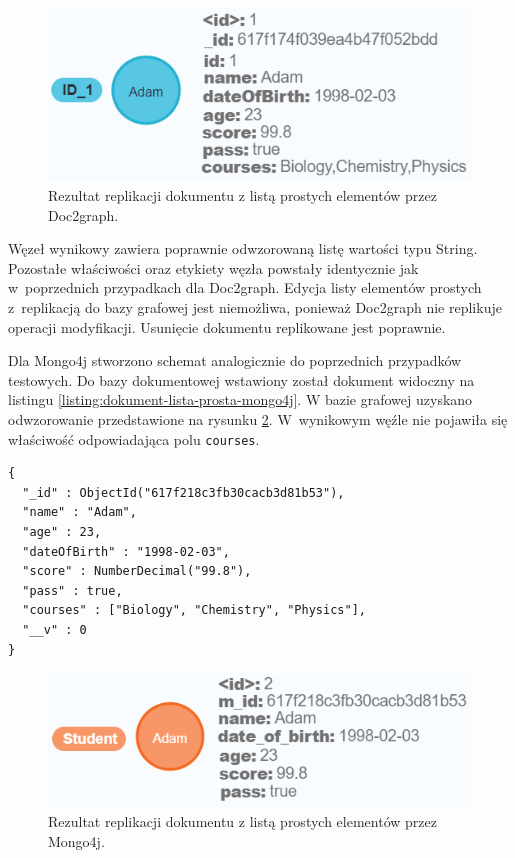 \documentclass[a4paper,twoside,12pt]{book}
\begin{document}
\begin{figure}[!h]
\centering
\includegraphics[width=12cm]{images/lista_prosta_doc2graph.png}
\caption{Rezultat replikacji dokumentu z listą prostych elementów przez Doc2graph.}
\label{fig:graf-lista-prosta-doc2graph}
\end{figure}

Węzeł wynikowy zawiera poprawnie odwzorowaną listę wartości typu String. Pozostałe właściwości oraz etykiety węzła powstały identycznie jak w~poprzednich przypadkach dla Doc2graph. 
Edycja listy elementów prostych z~replikacją do bazy grafowej jest niemożliwa, ponieważ Doc2graph nie replikuje operacji modyfikacji. Usunięcie dokumentu replikowane jest poprawnie.

Dla Mongo4j stworzono schemat analogicznie do poprzednich przypadków testowych. Do bazy dokumentowej wstawiony został dokument widoczny na listingu \ref{listing:dokument-lista-prosta-mongo4j}. W bazie grafowej uzyskano odwzorowanie przedstawione na rysunku \ref{fig:graf-lista-prosta-mongo4j}. W~wynikowym węźle nie pojawiła się właściwość odpowiadająca polu \texttt{courses}. 

\begin{lstlisting}[style=JSON, caption={Struktura dokumentu z listą prostych elementów wstawiona do bazy dokumentowej przez Mongo4j.}, label={listing:dokument-lista-prosta-mongo4j}, captionpos=b]
{
  "_id" : ObjectId("617f218c3fb30cacb3d81b53"),
  "name" : "Adam",
  "age" : 23,
  "dateOfBirth" : "1998-02-03",
  "score" : NumberDecimal("99.8"),
  "pass" : true,
  "courses" : ["Biology", "Chemistry", "Physics"],
  "__v" : 0
}
\end{lstlisting}

\begin{figure}[!h]
\centering
\includegraphics[width=12cm]{images/lista_prosta_mongo4j.png}
\caption{Rezultat replikacji dokumentu z listą prostych elementów przez Mongo4j.}
\label{fig:graf-lista-prosta-mongo4j}
\end{figure}
\end{document}
